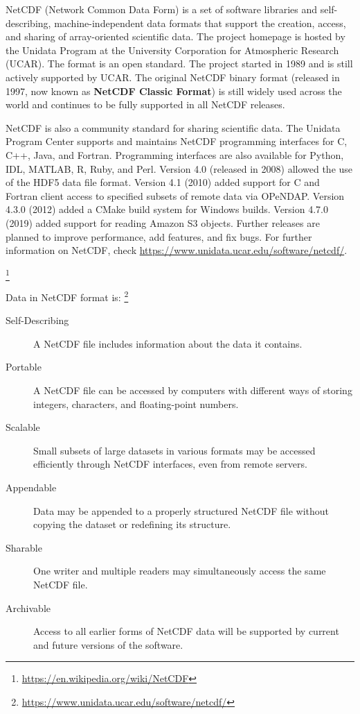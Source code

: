 {\itshape

NetCDF (Network Common Data Form) is a set of software libraries and self-describing, machine-independent data formats that support the creation, access, and sharing of array-oriented scientific data.
The project homepage is hosted by the Unidata Program at the University Corporation for Atmospheric Research (UCAR). The format is an open standard.
The project started in 1989 and is still actively supported by UCAR.
The original NetCDF binary format (released in 1997, now known as \textbf{NetCDF Classic Format}) is still widely used across the world and continues to be fully supported in all NetCDF releases.

NetCDF is also a community standard for sharing scientific data.
The Unidata Program Center supports and maintains NetCDF programming interfaces for C, C++, Java, and Fortran.
Programming interfaces are also available for Python, IDL, MATLAB, R, Ruby, and Perl.
Version 4.0 (released in 2008) allowed the use of the HDF5 data file format.
Version 4.1 (2010) added support for C and Fortran client access to specified subsets of remote data via OPeNDAP.
Version 4.3.0 (2012) added a CMake build system for Windows builds.
Version 4.7.0 (2019) added support for reading Amazon S3 objects. Further releases are planned to improve performance, add features, and fix bugs.
For further information on NetCDF, check \url{https://www.unidata.ucar.edu/software/netcdf/}.
}\footnote{\url{https://en.wikipedia.org/wiki/NetCDF}}

{\itshape

Data in NetCDF format is: \footnote{\url{https://www.unidata.ucar.edu/software/netcdf/}}

\begin{description}

\item[Self-Describing] A NetCDF file includes information about the data it contains.

\item[Portable] A NetCDF file can be accessed by computers with different ways of storing integers, characters, and floating-point numbers.

\item[Scalable] Small subsets of large datasets in various formats may be accessed efficiently through NetCDF interfaces, even from remote servers.

\item[Appendable] Data may be appended to a properly structured NetCDF file without copying the dataset or redefining its structure.

\item[Sharable] One writer and multiple readers may simultaneously access the same NetCDF file.

\item[Archivable] Access to all earlier forms of NetCDF data will be supported by current and future versions of the software.

\end{description}

}


